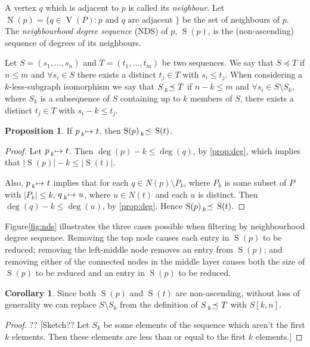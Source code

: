 \documentclass[letterpaper]{article}
\theoremstyle{definition}
\newtheorem{proposition}{Proposition}
\newtheorem{corollary}{Corollary}
\newcommand{\lessmap}[1]{\prescript{}{#1}{\mapsto}\ }
\newcommand{\lesspreceq}[1]{\prescript{}{#1}{\preceq}\ }
\newcommand{\V}{\operatorname{V}}
\newcommand{\N}{\operatorname{N}}
\newcommand{\nds}{\operatorname{S}}
\newcommand{\todo}[1]{{\color{red} {?? [}{#1}{]}}}
\begin{document}
A vertex $q$ which is adjacent to $p$ is called its \emph{neighbour}.  Let $\N(p) = \{ q \in \V(P) :
 p \text{ and } q \text{ are adjacent }\}$ be the set of neighbours of $p$.  The \emph{neighbourhood
degree sequence} (NDS) of $p$, $\nds(p)$, is the (non-ascending) sequence of degrees of its
neighbours.

Let $S = ( s_1 , \ldots , s_n )$ and $T = ( t_1 , \ldots , t_m)$ be two sequences.  We say that $S
\preceq T$ if $n \leq m$ and $\forall s_i \in S$ there exists a distinct $t_j \in T$ with $s_i \leq
t_j$.  When considering a $k$-less-subgraph isomorphism we say that $S \lesspreceq{k}
T$ if $n - k \leq m$ and $\forall s_i \in S \setminus S_k$, where $S_k$ is a subsequence of $S$
containing up to $k$ members of $S$, there exists a distinct $t_j \in T$ with $s_i - k \leq t_j$.


\begin{proposition}\label{prop:nds}
If $p \lessmap{k} t$, then $\nds(p) \lesspreceq{k} \nds(t)$.
\end{proposition}

\begin{proof}
Let $p \lessmap{k} t$.  Then $\deg(p) - k \leq \deg(q)$, by \cref{prop:deg}, which
implies that $\left|\nds(p)\right| -k \leq \left| \nds(t) \right| $.

Also, $p \lessmap{k} t$ implies that for each $q \in N(p) \setminus P_k$, where $P_k$
is some subset of $P$ with $\left| P_k \right| \leq k$, $q \lessmap{k} u$, where $u \in N(t)$ and
each $u$ is distinct.  Then $\deg(q) - k \leq \deg(u)$, by \cref{prop:deg}.  Hence $\nds(p)
\lesspreceq{k} \nds(t)$.
\end{proof}

Figure\ref{fig:nds} illustrates the three cases possible when filtering by neighbourhood degree
sequence.  Removing the top node causes each entry in $\nds(p)$ to be reduced; removing the
left-middle node removes an entry from $\nds(p)$; and removing either of the connected nodes in the
middle layer causes both the size of $\nds(p)$ to be reduced and an entry in $\nds(p)$ to be reduced.

\begin{corollary}
Since both $\nds(p)$ and $\nds(t)$ are non-ascending, without loss of generality we can replace
$S \setminus S_k$ from the definition of $S \lesspreceq{k} T$ with $S[k, n]$.
\end{corollary}

\begin{proof}
\todo{Sketch?? Let $S_k$ be some elements of the sequence which aren't the first $k$ elements.  Then these elements are less than or equal to the first $k$ elements.}
\end{proof}
\end{document}
